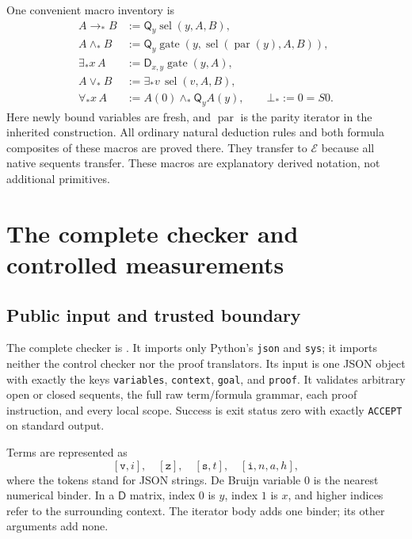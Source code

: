 \documentclass[11pt]{article}
\theoremstyle{definition}
\newcommand{\E}{\mathcal E}
\newcommand{\Q}{\mathsf Q}
\newcommand{\D}{\mathsf D}
\begin{document}
One convenient macro inventory is
\begin{align*}
 A\to_*B&:=\Q_y\operatorname{sel}(y,A,B),\\
 A\wedge_*B&:=\Q_y\operatorname{gate}
       (y,\operatorname{sel}(\operatorname{par}(y),A,B)),\\
 \exists_*x\,A&:=\D_{x,y}\operatorname{gate}(y,A),\\
 A\vee_*B&:=\exists_*v\,\operatorname{sel}(v,A,B),\\
 \forall_*x\,A&:=A(0)\wedge_*\Q_y A(y),
 \qquad \bot_*:=0=S0.
\end{align*}
Here newly bound variables are fresh, and $\operatorname{par}$ is the
parity iterator in the inherited construction. All ordinary natural
deduction rules and both formula composites of these macros are proved
there. They transfer to $\E$ because all native sequents transfer.
These macros are explanatory derived notation, not additional primitives.

\section{The complete checker and controlled measurements}
\label{sec:software}

\subsection{Public input and trusted boundary}

The complete checker is . It imports only Python's
\texttt{json} and \texttt{sys}; it imports neither the control checker nor
the proof translators. Its input is one JSON object with exactly the keys
\texttt{variables}, \texttt{context}, \texttt{goal}, and \texttt{proof}.
It validates arbitrary open or closed sequents, the full raw term/formula
grammar, each proof instruction, and every local scope. Success is exit
status zero with exactly \texttt{ACCEPT} on standard output.

Terms are represented as
\[
 [\texttt{v},i],\quad[\texttt{z}],\quad[\texttt{s},t],
 \quad[\texttt{i},n,a,h],
\]
where the tokens stand for JSON strings. De Bruijn variable $0$ is the
nearest numerical binder. In a $\D$ matrix, index $0$ is $y$, index $1$
is $x$, and higher indices refer to the surrounding context. The iterator
body adds one binder; its other arguments add none.
\end{document}
